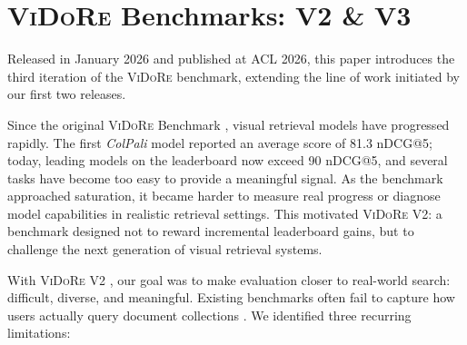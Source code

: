\setchapterpreamble[u]{\margintoc}
\chapter{\textsc{ViDoRe} Benchmarks: V2 \& V3}
\label{ch:vidorev3}
\raggedbottom


\begin{sagekaobox}[frametitle=Paper Context]
Released in January 2026 and published at ACL 2026, this paper introduces the third iteration of the \textsc{ViDoRe} benchmark, extending the line of work initiated by our first two releases.

Since the original \textsc{ViDoRe} Benchmark \cite{faysse2025colpaliefficientdocumentretrieval}, visual retrieval models have progressed rapidly. The first \emph{ColPali} model reported an average score of 81.3 nDCG@5; today, leading models on the leaderboard now exceed 90 nDCG@5, and several tasks have become too easy to provide a meaningful signal. As the benchmark approached saturation, it became harder to measure real progress or diagnose model capabilities in realistic retrieval settings. This motivated \textsc{ViDoRe} V2: a benchmark designed not to reward incremental leaderboard gains, but to challenge the next generation of visual retrieval systems.

With \textsc{ViDoRe} V2 \cite{macé2025vidorebenchmarkv2raising}, our goal was to make evaluation closer to real-world search: difficult, diverse, and meaningful. Existing benchmarks often fail to capture how users actually query document collections . We identified three recurring limitations:


\end{sagekaobox}

